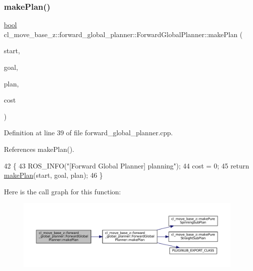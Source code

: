 \subsubsection{\texorpdfstring{make\+Plan()}{makePlan()}\hspace{0.1cm}{\footnotesize\ttfamily [2/2]}}
{\footnotesize\ttfamily \hyperlink{classbool}{bool} cl\+\_\+move\+\_\+base\+\_\+z\+::forward\+\_\+global\+\_\+planner\+::\+Forward\+Global\+Planner\+::make\+Plan (\begin{DoxyParamCaption}\item[{const geometry\+\_\+msgs\+::\+Pose\+Stamped \&}]{start,  }\item[{const geometry\+\_\+msgs\+::\+Pose\+Stamped \&}]{goal,  }\item[{std\+::vector$<$ geometry\+\_\+msgs\+::\+Pose\+Stamped $>$ \&}]{plan,  }\item[{double \&}]{cost }\end{DoxyParamCaption})}



Definition at line 39 of file forward\+\_\+global\+\_\+planner.\+cpp.



References make\+Plan().


\begin{DoxyCode}
42 \{
43     ROS\_INFO(\textcolor{stringliteral}{"[Forward Global Planner] planning"});
44     cost = 0;
45     \textcolor{keywordflow}{return} \hyperlink{classcl__move__base__z_1_1forward__global__planner_1_1ForwardGlobalPlanner_a9d7c48877a390ca3cc580a7ffa50d316}{makePlan}(start, goal, plan);
46 \}
\end{DoxyCode}
Here is the call graph for this function\+:
\nopagebreak
\begin{figure}[H]
\begin{center}
\leavevmode
\includegraphics[width=350pt]{classcl__move__base__z_1_1forward__global__planner_1_1ForwardGlobalPlanner_ab01769603169105e92d9b6e479147bce_cgraph}
\end{center}
\end{figure}



